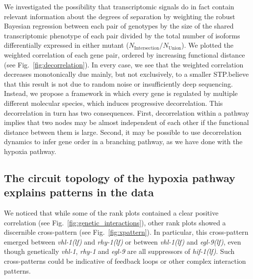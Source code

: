 \documentclass[9pt,twocolumn,twoside,lineno]{pnas-new}
\newcommand{\gene}[1]{\emph{#1}}
\newcommand{\egl}{\emph{\mbox{egl-9}(lf)}}
\newcommand{\rhy}{\emph{\mbox{rhy-1}(lf)}}
\newcommand{\vhl}{\emph{\mbox{vhl-1}(lf)}}
\newcommand{\hif}{\emph{\mbox{hif-1(lf)}}}
\begin{document}
We investigated the possibility that transcriptomic signals do in fact contain
relevant information about the degrees of separation by weighting the robust
Bayesian regression between each pair of genotypes by the size of the shared
transcriptomic phenotype of each pair divided by the total number of isoforms
differentially expressed in either mutant
($N_\mathrm{Intersection}/N_{\mathrm{Union}}$). We plotted the weighted
correlation of each gene pair, ordered by increasing functional distance
(see Fig.~\ref{fig:decorrelation}). In every case, we see that the weighted
correlation decreases monotonically due mainly, but not exclusively, to a smaller
STP.\@We believe that this result is not due to random noise or insufficiently
deep sequencing. Instead, we propose a framework in which every gene is regulated
by multiple different molecular species, which induces progressive decorrelation.
This decorrelation in turn has two consequences. First, decorrelation within a
pathway implies that two nodes may be almost independent of each other if the
functional distance between them is large. Second, it may be possible to use
decorrelation dynamics to infer gene order in a branching pathway, as we have
done with the hypoxia pathway.

\subsection*{The circuit topology of the hypoxia pathway explains patterns in
            the data}
\label{sub:topology}
We noticed that while some of the rank plots contained a clear positive correlation
(see Fig.~\ref{fig:genetic_interactions}), other rank plots showed a discernible
cross-pattern (see Fig.~\ref{fig:xpattern}). In particular, this cross-pattern
emerged between \vhl{} and \rhy{} or between \vhl{} and \egl{}, even though
genetically \gene{vhl-1}, \gene{rhy-1} and \gene{egl-9} are all suppressors of
\hif{}. Such cross-patterns could be indicative of feedback loops or other
complex interaction patterns.

\end{document}
